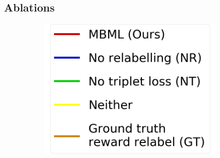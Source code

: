 \subsection{Ablations}\label{sec_exp_ablation}

\begin{figure}[!t]
    \begin{minipage}{0.28\textwidth}
        \begin{figure}[H]
            \centering
            \includegraphics[width=\textwidth]{chapter_2/fig/legend_ablation.png}
        \end{figure}
    \end{minipage}
    \hfill
    \addtocounter{figure}{-1}
    \begin{minipage}{0.70\textwidth}

\end{minipage}
\end{figure}
